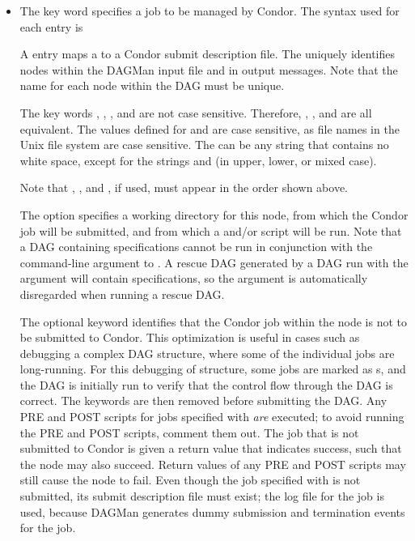 \begin{itemize}

\label{dagman:JOB}
\item {}

The  key word specifies a job to be managed by Condor.
The syntax used for each  entry is

  
  

A  entry maps a  to a Condor submit description file.
The  uniquely identifies nodes within the
DAGMan input file and in output messages.
Note that the name for each node within the DAG
must be unique.

The key words , , , and 
are not case sensitive.
Therefore, , , and  are all equivalent.
The values defined for  and 
are case sensitive, as file names in
the Unix file system are case sensitive.
The  can be any string that contains no white space, except
for the strings  and  (in upper, lower, or mixed
case).

Note that , , and , if used, must appear
in the order shown above.

The  option specifies a working directory
for this node,
from which the Condor job will be submitted,
and from which a  and/or
 script will be run.
Note that a DAG containing  specifications cannot
be run in conjunction with the  command-line
argument to .  A rescue DAG generated by
a DAG run with the  argument will contain
 specifications, so the  argument is
automatically disregarded when running a rescue DAG.

\label{dagman:NOOP}
The optional  keyword identifies that the Condor job within
the node is not to be submitted to Condor.
This optimization is useful in cases such as debugging a complex DAG structure,
where some of the individual jobs are long-running.
For this debugging of structure,
some jobs are marked as s, and
the DAG is initially run to verify that the control flow through
the DAG is correct.
The  keywords are then removed before submitting the DAG.
Any PRE and POST scripts
for jobs specified with  \emph{are} executed;
to avoid running the PRE and POST scripts, comment them out.
The job that is not submitted to Condor is given a return value that indicates
success, such that the node may also succeed.
Return values of any 
PRE and POST scripts may still cause the node to fail.
Even though the job specified with  is not submitted,
its submit description file must exist;
the log file for the job is used, 
because DAGMan generates dummy submission and termination events for the job.


\end{itemize}
